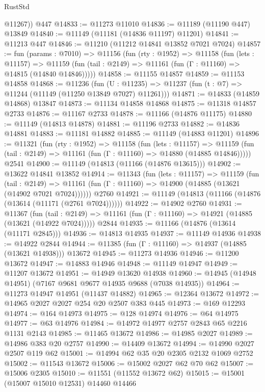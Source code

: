 \begin{lexlean}{RustStd}
\begin{coremodule}
        @11267))
    @447
@14833 := @11273 @11010
@14836 := @11189 (@11190 @447) @13849
@14840 := @11149 (@11181 (@14836 @11197) @11201)
@14841 := @11213 @447
@14846 := @11210 (@11212 @14841 @13852 @7021 @7024)
@14857 := fun (params : @7010) =>
  @11156
    (fun (rty : @1952) =>
    @11158
      (fun (lets : @11157) =>
      @11159 (fun (tail : @2149) => @11161 (fun (Γ : @11160) => @14815 (@14840 @14846)))))
@14858 := @11155 @14857
@14859 := @11153 @14858
@14868 := @11236
    (fun (U : @11235) => @11237 (fun (t : @7) => @11244 (@11149 (@11250 @13849 @7027) @11261)))
@14871 := @14833 (@14859 @14868) @13847
@14873 := @11134 @14858 @14868
@14875 := @11318 @14857 @2733
@14876 := @11167 @2733
@14878 := @11166 (@14876 @11175)
@14880 := @11149 (@14813 @14878)
@14881 := @11196 @2733
@14882 := @14836 @14881
@14883 := @11181 @14882
@14885 := @11149 (@14883 @11201)
@14896 := @11321
    (fun (rty : @1952) =>
    @11158
      (fun (lets : @11157) =>
      @11159 (fun (tail : @2149) => @11161 (fun (Γ : @11160) => @14880 (@14885 @14846)))))
    @2541
@14900 := @11149 (@14813 (@11166 (@14876 @13615)))
@14902 := @13622 @14841 @13852
@14914 := @11343
    (fun (lets : @11157) =>
    @11159
      (fun (tail : @2149) =>
      @11161 (fun (Γ : @11160) => @14900 (@14885 (@13621 (@14902 @7021 @7024))))))
    @2760
@14921 := @11149 (@14813 (@11166 (@14876 (@13614 (@11171 (@2761 @7024))))))
@14922 := @14902 @2760
@14931 := @11367
    (fun (tail : @2149) => @11161 (fun (Γ : @11160) => @14921 (@14885 (@13621 (@14922 @7024)))))
    @2844
@14935 := @11166 (@14876 (@13614 (@11171 @2845)))
@14936 := @14813 @14935
@14937 := @11149 @14936
@14938 := @14922 @2844
@14944 := @11385 (fun (Γ : @11160) => @14937 (@14885 (@13621 @14938))) @13672
@14945 := @11273 @14936
@14946 := @11200 @13672
@14947 := @14883 @14946
@14948 := @11149 @14947
@14949 := @11207 @13672
@14951 := @14949 @13620 @14938
@14960 := @14945 (@14948 @14951) (@7167 @9681 @9677 @14935 @9688 (@7038 @14935))
@14964 := @11273 @14947 @14951 (@11437 @14882)
@14965 := @12364 @13672
@14972 := @14965 @2027 @2027 @254 @20 @2507 @383 @445
@14973 := @169 @12293
@14974 := @164 @14973
@14975 := @128 @14974
@14976 := @64 @14975
@14977 := @63 @14976
@14984 := @14972 @14977 @2757 @2843 @65 @2216 @1131 @2143
@14985 := @11465 @13672
@14986 := @14985 @2027
@14989 := @14986 @383 @20 @2757
@14990 := @14409 @13672
@14994 := @14990 @2027 @2507 @119 @62
@15001 := @14994 @62 @35 @20 @2305 @2132 @1069 @2752
@15002 := @11543 @13672
@15006 := @15002 @2027 @62 @70 @62
@15007 := @15006 @2305
@15010 := @11551 (@11552 @13672 @62)
@15015 := @15001 (@15007 @15010 @12531) @14460 @14466

\end{coremodule}
\end{lexlean}
